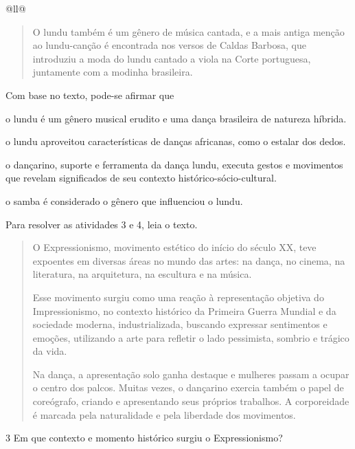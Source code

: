 \begin{itemize}
\begin{itemize}
\begin{escolha}[]{@{}ll@{}}
\begin{quote}
O lundu também é um gênero de música cantada, e a mais antiga menção ao lundu-canção é 
encontrada nos versos de Caldas Barbosa, que introduziu a moda do lundu cantado a viola 
na Corte portuguesa, juntamente com a modinha brasileira.

\end{quote}

Com base no texto, pode-se afirmar que

\begin{escolha}
\item
  o lundu é um gênero musical erudito e uma dança brasileira de
  natureza híbrida.
\item
  o lundu aproveitou características de danças africanas, como o estalar
  dos dedos.
\item
  o dançarino, suporte e ferramenta da dança lundu, executa gestos e
  movimentos que revelam significados de seu contexto
  histórico-sócio-cultural. 
\item
  o samba é considerado o gênero que influenciou o lundu.
\end{escolha}

Para resolver as atividades 3 e 4, leia o texto.

\begin{quote}
O Expressionismo, movimento estético do início do século XX, teve
expoentes em diversas áreas no mundo das artes: na dança, no cinema, na
literatura, na arquitetura, na escultura e na música.

Esse movimento surgiu como uma reação à representação objetiva do
Impressionismo, no contexto histórico da Primeira Guerra Mundial e da
sociedade moderna, industrializada, buscando expressar sentimentos e
emoções, utilizando a arte para refletir o lado pessimista, sombrio e
trágico da vida.

Na dança, a apresentação solo ganha destaque e mulheres passam a ocupar
o centro dos palcos. Muitas vezes, o dançarino exercia também o papel de
coreógrafo, criando e apresentando seus próprios trabalhos. A
corporeidade é marcada pela naturalidade e pela liberdade dos movimentos.

\end{quote}

\num{3} Em que contexto e momento histórico surgiu o Expressionismo?


\end{escolha}
\end{itemize}
\end{itemize}
